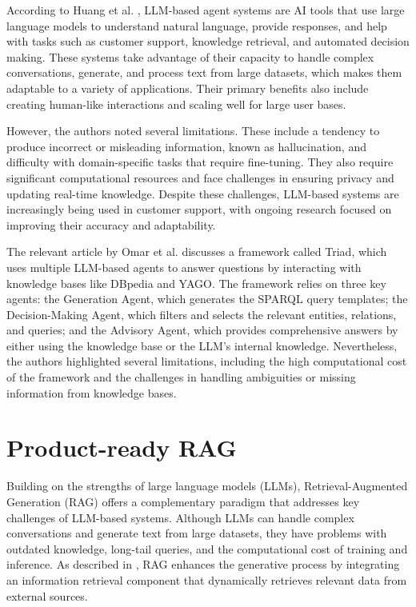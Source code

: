 According to Huang et al. \cite{xi2023rise}, LLM-based agent systems are AI tools that use large language models to understand natural language, provide responses, and help with tasks such as customer support, knowledge retrieval, and automated decision making. These systems take advantage of their capacity to handle complex conversations, generate, and process text from large datasets, which makes them adaptable to a variety of applications. Their primary benefits also include creating human-like interactions and scaling well for large user bases.

However, the authors noted several limitations. These include a tendency to produce incorrect or misleading information, known as hallucination, and difficulty with domain-specific tasks that require fine-tuning. They also require significant computational resources and face challenges in ensuring privacy and updating real-time knowledge. Despite these challenges, LLM-based systems are increasingly being used in customer support, with ongoing research focused on improving their accuracy and adaptability.

The relevant article by Omar et al. \cite{zong2024triad} discusses a framework called Triad, which uses multiple LLM-based agents to answer questions by interacting with knowledge bases like DBpedia and YAGO. The framework relies on three key agents: the Generation Agent, which generates the SPARQL query templates; the Decision-Making Agent, which filters and selects the relevant entities, relations, and queries; and the Advisory Agent, which provides comprehensive answers by either using the knowledge base or the LLM's internal knowledge. Nevertheless, the authors highlighted several limitations, including the high computational cost of the framework and the challenges in handling ambiguities or missing information from knowledge bases. 



\section{Product-ready RAG}

Building on the strengths of large language models (LLMs), Retrieval-Augmented Generation (RAG) offers a complementary paradigm that addresses key challenges of LLM-based systems. Although LLMs can handle complex conversations and generate text from large datasets, they have problems with outdated knowledge, long-tail queries, and the computational cost of training and inference. As described in \cite{zhao2024retrieval}, RAG enhances the generative process by integrating an information retrieval component that dynamically retrieves relevant data from external sources.  

